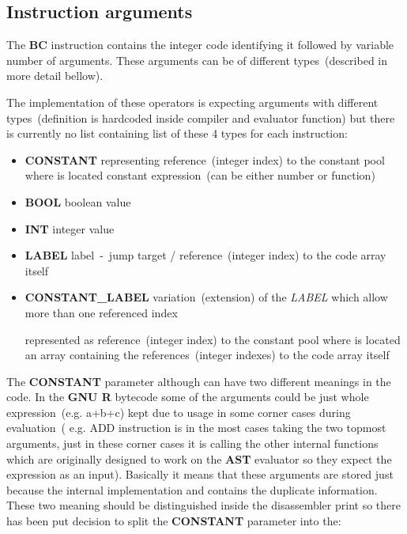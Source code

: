 \documentclass[thesis=M,english]{FITthesis}[2018/10/20]
\begin{document}
\subsection{Instruction arguments}\label{instruction-arguments}
The \textbf{BC} instruction contains the integer code identifying it followed by variable number of arguments. These arguments can be of different types~(described in more detail bellow). 

The implementation of these operators is expecting arguments with different types~(definition is hardcoded inside compiler and evaluator function) but there is currently no list containing list of these 4 types for each instruction:

\begin{itemize}
	\item \textbf{CONSTANT} representing reference~(integer index) to the constant pool where is located constant expression~(can be either number or function)

	\item \textbf{BOOL} boolean value

	\item \textbf{INT} integer value

	\item \textbf{LABEL} label~-~jump target / reference~(integer index) to the code array itself

	\item \textbf{CONSTANT{\_}LABEL} variation~(extension) of the \textit{LABEL} which allow more than one referenced index
	
	represented as reference~(integer index) to the constant pool where is located an array containing the references~(integer indexes) to the code array itself
\end{itemize}

The \textbf{CONSTANT} parameter although can have two different meanings in the code. In the \textbf{GNU R} bytecode some of the arguments could be just whole expression~(e.g. a+b+c) kept due to usage in some corner cases during evaluation~( e.g. ADD instruction is in the most cases taking the two topmost arguments, just in these corner cases it is calling the other internal functions which are originally designed to work on the \textbf{AST} evaluator so they expect the expression as an input). Basically it means that these arguments are stored just because the internal implementation and contains the duplicate information. These two meaning should be distinguished inside the disassembler print so there has been put decision to split the \textbf{CONSTANT} parameter into the:
\end{document}
